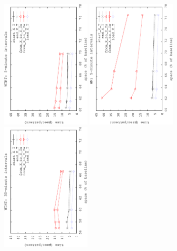	\begin{figure}[ht]
		\begin{center}
			{\includegraphics[angle=-90,width=0.4\textwidth]{figures_synt/madrid_ht5.eps}}
			{\includegraphics[angle=-90,width=0.4\textwidth]{figures_synt/madrid_wm5.eps}}
			{\includegraphics[angle=-90,width=0.4\textwidth]{figures_synt/madrid_ht30.eps}}

\end{center}
\end{figure}
